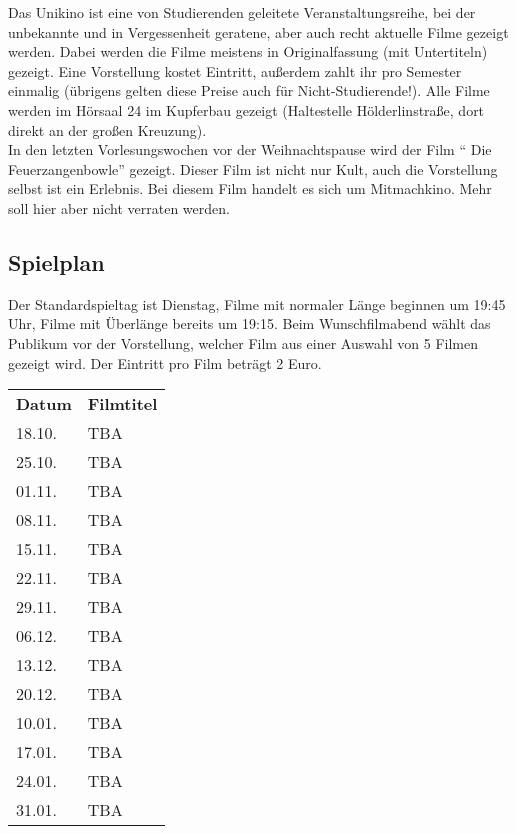 Das Unikino ist eine von Studierenden geleitete Veranstaltungsreihe, bei der
unbekannte und in Vergessenheit geratene, aber auch recht aktuelle Filme
gezeigt werden. Dabei werden die Filme meistens in Originalfassung (mit
Untertiteln) gezeigt. Eine Vorstellung kostet  Eintritt, außerdem zahlt
ihr pro Semester einmalig  (übrigens gelten diese Preise auch für
Nicht-Studierende!). Alle Filme werden im Hörsaal 24 im Kupferbau gezeigt
(Haltestelle Hölderlinstraße, dort direkt an der großen Kreuzung).\\ 
In den letzten Vorlesungswochen vor der Weihnachtspause wird der Film 
"` Die Feu\-er\-zang\-en\-bow\-le"' gezeigt. Dieser Film ist nicht nur Kult,
auch die Vorstellung selbst ist ein Erlebnis. Bei diesem Film handelt es sich 
um Mitmachkino. Mehr soll hier aber nicht verraten werden.


\vspace*{-1em}

\subsection*{Spielplan}
Der Standardspieltag ist Dienstag, Filme mit normaler Länge beginnen um 19:45 Uhr, Filme mit Überlänge bereits um 19:15. Beim Wunschfilmabend wählt das Publikum vor der Vorstellung, welcher Film aus einer Auswahl von 5 Filmen gezeigt wird. Der Eintritt pro Film beträgt 2 Euro.  
\medskip \\
\renewcommand{\arraystretch}{1.2}
\begin{tabular}{l l}
\textbf{Datum} & \textbf{Filmtitel}     			\\
18.10. & TBA \\
25.10. & TBA \\
01.11. & TBA \\
08.11. & TBA \\
15.11. & TBA \\
22.11. & TBA \\
29.11. & TBA \\
06.12. & TBA \\
13.12. & TBA \\
20.12. & TBA \\
10.01. & TBA \\
17.01. & TBA \\
24.01. & TBA \\
31.01. & TBA \\

\end{tabular}


